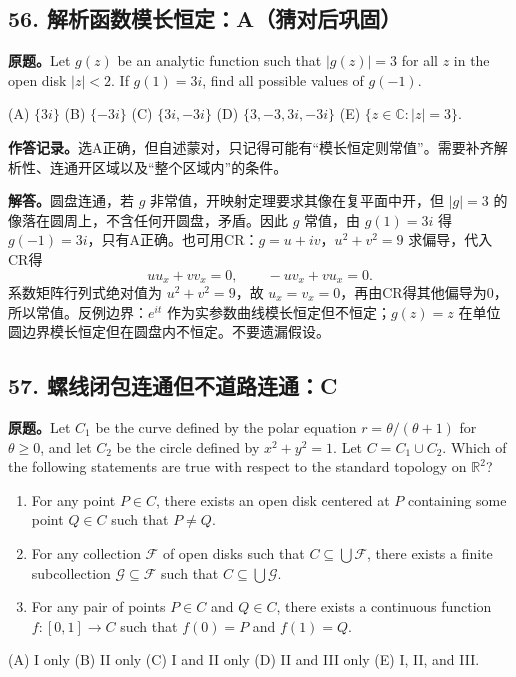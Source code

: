 \documentclass[11pt,a4paper,fontset=fandol]{ctexart}
\begin{document}
\subsection{56. 解析函数模长恒定：A（猜对后巩固）}
\label{ms:q56}
\textbf{原题。}Let $g(z)$ be an analytic function such that $|g(z)|=3$ for all $z$ in the open disk $|z|<2$. If $g(1)=3i$, find all possible values of $g(-1)$.

(A) $\{3i\}$ \quad (B) $\{-3i\}$ \quad (C) $\{3i,-3i\}$ \quad (D) $\{3,-3,3i,-3i\}$ \quad (E) $\{z\in\mathbb C:|z|=3\}$.

\textbf{作答记录。}选A正确，但自述蒙对，只记得可能有“模长恒定则常值”。需要补齐解析性、连通开区域以及“整个区域内”的条件。

\textbf{解答。}圆盘连通，若 $g$ 非常值，开映射定理要求其像在复平面中开，但 $|g|=3$ 的像落在圆周上，不含任何开圆盘，矛盾。因此 $g$ 常值，由 $g(1)=3i$ 得 $g(-1)=3i$，只有A正确。也可用CR：$g=u+iv$，$u^2+v^2=9$ 求偏导，代入CR得
\[
u u_x+v v_x=0,\qquad -u v_x+v u_x=0.
\]
系数矩阵行列式绝对值为 $u^2+v^2=9$，故 $u_x=v_x=0$，再由CR得其他偏导为0，所以常值。反例边界：$e^{it}$ 作为实参数曲线模长恒定但不恒定；$g(z)=z$ 在单位圆边界模长恒定但在圆盘内不恒定。不要遗漏假设。

\subsection{57. 螺线闭包连通但不道路连通：C}
\label{ms:q57}
\textbf{原题。}Let $C_1$ be the curve defined by the polar equation $r=\theta/(\theta+1)$ for $\theta\ge0$, and let $C_2$ be the circle defined by $x^2+y^2=1$. Let $C=C_1\cup C_2$. Which of the following statements are true with respect to the standard topology on $\mathbb R^2$?
\begin{enumerate}[label=\Roman*.]
\item For any point $P\in C$, there exists an open disk centered at $P$ containing some point $Q\in C$ such that $P\ne Q$.
\item For any collection $\mathcal F$ of open disks such that $C\subseteq\bigcup\mathcal F$, there exists a finite subcollection $\mathcal G\subseteq\mathcal F$ such that $C\subseteq\bigcup\mathcal G$.
\item For any pair of points $P\in C$ and $Q\in C$, there exists a continuous function $f:[0,1]\to C$ such that $f(0)=P$ and $f(1)=Q$.
\end{enumerate}
(A) I only \quad (B) II only \quad (C) I and II only \quad (D) II and III only \quad (E) I, II, and III.
\end{document}
